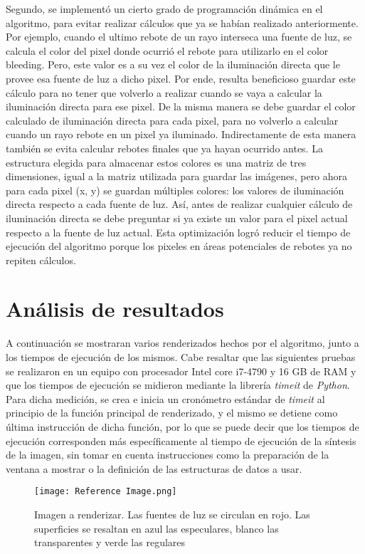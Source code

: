 \documentclass[conference]{IEEEtran}
\begin{document}
Segundo, se implementó un cierto grado de programación dinámica en el algoritmo, para evitar realizar cálculos que ya se habían realizado anteriormente. Por ejemplo, cuando el ultimo rebote de un rayo interseca una fuente de luz, se calcula el color del pixel donde ocurrió el rebote para utilizarlo en el color bleeding. Pero, este valor es a su vez el color de la iluminación directa que le provee esa fuente de luz a dicho pixel. Por ende, resulta beneficioso guardar este cálculo para no tener que volverlo a realizar cuando se vaya a calcular la iluminación directa para ese pixel. De la misma manera se debe guardar el color calculado de iluminación directa para cada pixel, para no volverlo a calcular cuando un rayo rebote en un pixel ya iluminado. Indirectamente de esta manera también se evita calcular rebotes finales que ya hayan ocurrido antes. La estructura elegida para almacenar estos colores es una matriz de tres dimensiones, igual a la matriz utilizada para guardar las imágenes, pero ahora para cada pixel (x, y) se guardan múltiples colores: los valores de iluminación directa respecto a cada fuente de luz. Así, antes de realizar cualquier cálculo de iluminación directa se debe preguntar si ya existe un valor para el pixel actual respecto a la fuente de luz actual. Esta optimización logró reducir el tiempo de ejecución del algoritmo porque los pixeles en áreas potenciales de rebotes ya no repiten cálculos.

\section{Análisis de resultados}

A continuación se mostraran varios renderizados hechos por el algoritmo, junto a los tiempos de ejecución de los mismos. Cabe resaltar que las siguientes pruebas se realizaron en un equipo con procesador Intel core i7-4790 y 16 GB de RAM y que los tiempos de ejecución se midieron mediante la librería \textit{timeit} de \textit{Python}. Para dicha medición, se crea e inicia un cronómetro estándar de \textit{timeit} al principio de la función principal de renderizado, y el mismo se detiene como última instrucción de dicha función, por lo que se puede decir que los tiempos de ejecución corresponden más específicamente al tiempo de ejecución de la síntesis de la imagen, sin tomar en cuenta instrucciones como la preparación de la ventana a mostrar o la definición de las estructuras de datos a usar. 

\begin{figure}[htbp]
\centerline{\texttt{[image: Reference Image.png]}}
\caption{Imagen a renderizar. Las fuentes de luz se circulan en rojo. Las superficies se resaltan en azul las especulares, blanco las transparentes y verde las regulares}
\label{Imagen de referencia}
\end{figure}
\end{document}
